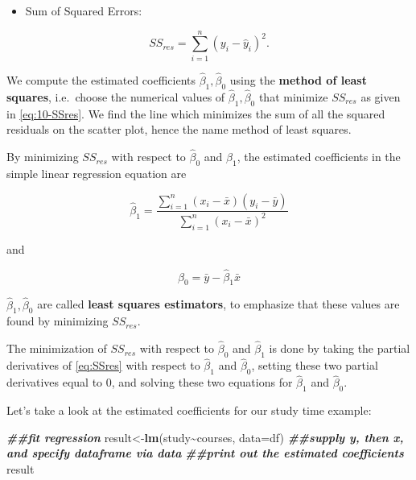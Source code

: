 \documentclass[
]{book}
\newenvironment{Shaded}{\begin{snugshade}}{\end{snugshade}}
\newcommand{\AttributeTok}[1]{\textcolor[rgb]{0.13,0.29,0.53}{#1}}
\newcommand{\DocumentationTok}[1]{\textcolor[rgb]{0.56,0.35,0.01}{\textbf{\textit{#1}}}}
\newcommand{\FunctionTok}[1]{\textcolor[rgb]{0.13,0.29,0.53}{\textbf{#1}}}
\newcommand{\NormalTok}[1]{#1}
\newcommand{\OtherTok}[1]{\textcolor[rgb]{0.56,0.35,0.01}{#1}}
\newcommand{\SpecialCharTok}[1]{\textcolor[rgb]{0.81,0.36,0.00}{\textbf{#1}}}
\providecommand{\tightlist}{%
  \setlength{\itemsep}{0pt}\setlength{\parskip}{0pt}}
\begin{document}
\begin{itemize}
\tightlist
\item
  Sum of Squared Errors:
\end{itemize}

\begin{equation} 
SS_{res} =  \sum\limits_{i=1}^n(y_i-\hat{y}_i)^2.
\label{eq:10-SSres}
\end{equation}

We compute the estimated coefficients \(\hat{\beta}_1,\hat{\beta}_0\) using the \textbf{method of least squares}, i.e.~choose the numerical values of \(\hat{\beta}_1,\hat{\beta}_0\) that minimize \(SS_{res}\) as given in \eqref{eq:10-SSres}. We find the line which minimizes the sum of all the squared residuals on the scatter plot, hence the name method of least squares.

By minimizing \(SS_{res}\) with respect to \(\hat{\beta}_0\) and \(\hat{\beta}_1\), the estimated coefficients in the simple linear regression equation are

\begin{equation} 
\hat{\beta}_1 = \frac{\sum\limits_{i=1}^n(x_i-\bar{x})(y_i-\bar{y})}{\sum\limits_{i=1}^n(x_i-\bar{x})^2}
\label{eq:10-b1}
\end{equation}

and

\begin{equation} 
\hat{\beta}_0 = \bar{y}- \hat{\beta}_1 \bar{x}
\label{eq:10-b0}
\end{equation}

\(\hat{\beta}_1, \hat{\beta}_0\) are called \textbf{least squares estimators}, to emphasize that these values are found by minimizing \(SS_{res}\).

The minimization of \(SS_{res}\) with respect to \(\hat{\beta}_0\) and \(\hat{\beta}_1\) is done by taking the partial derivatives of \eqref{eq:SSres} with respect to \(\hat{\beta}_1\) and \(\hat{\beta}_0\), setting these two partial derivatives equal to 0, and solving these two equations for \(\hat{\beta}_1\) and \(\hat{\beta}_0\).

Let's take a look at the estimated coefficients for our study time example:

\begin{Shaded}
\begin{Highlighting}[]
\DocumentationTok{\#\#fit regression}
\NormalTok{result}\OtherTok{\textless{}{-}}\FunctionTok{lm}\NormalTok{(study}\SpecialCharTok{\textasciitilde{}}\NormalTok{courses, }\AttributeTok{data=}\NormalTok{df) }\DocumentationTok{\#\#supply y, then x, and specify dataframe via data}
\DocumentationTok{\#\#print out the estimated coefficients}
\NormalTok{result}
\end{Highlighting}
\end{Shaded}
\end{document}

